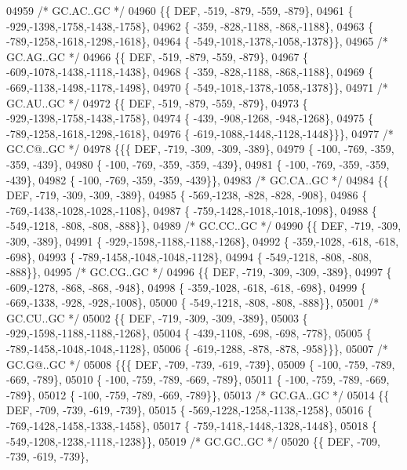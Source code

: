 \begin{DoxyCode}
04959 \textcolor{comment}{/* GC.AC..GC */}
04960 \{\{  DEF, -519, -879, -559, -879\},
04961 \{ -929,-1398,-1758,-1438,-1758\},
04962 \{ -359, -828,-1188, -868,-1188\},
04963 \{ -789,-1258,-1618,-1298,-1618\},
04964 \{ -549,-1018,-1378,-1058,-1378\}\},
04965 \textcolor{comment}{/* GC.AG..GC */}
04966 \{\{  DEF, -519, -879, -559, -879\},
04967 \{ -609,-1078,-1438,-1118,-1438\},
04968 \{ -359, -828,-1188, -868,-1188\},
04969 \{ -669,-1138,-1498,-1178,-1498\},
04970 \{ -549,-1018,-1378,-1058,-1378\}\},
04971 \textcolor{comment}{/* GC.AU..GC */}
04972 \{\{  DEF, -519, -879, -559, -879\},
04973 \{ -929,-1398,-1758,-1438,-1758\},
04974 \{ -439, -908,-1268, -948,-1268\},
04975 \{ -789,-1258,-1618,-1298,-1618\},
04976 \{ -619,-1088,-1448,-1128,-1448\}\}\},
04977 \textcolor{comment}{/* GC.C@..GC */}
04978 \{\{\{  DEF, -719, -309, -309, -389\},
04979 \{ -100, -769, -359, -359, -439\},
04980 \{ -100, -769, -359, -359, -439\},
04981 \{ -100, -769, -359, -359, -439\},
04982 \{ -100, -769, -359, -359, -439\}\},
04983 \textcolor{comment}{/* GC.CA..GC */}
04984 \{\{  DEF, -719, -309, -309, -389\},
04985 \{ -569,-1238, -828, -828, -908\},
04986 \{ -769,-1438,-1028,-1028,-1108\},
04987 \{ -759,-1428,-1018,-1018,-1098\},
04988 \{ -549,-1218, -808, -808, -888\}\},
04989 \textcolor{comment}{/* GC.CC..GC */}
04990 \{\{  DEF, -719, -309, -309, -389\},
04991 \{ -929,-1598,-1188,-1188,-1268\},
04992 \{ -359,-1028, -618, -618, -698\},
04993 \{ -789,-1458,-1048,-1048,-1128\},
04994 \{ -549,-1218, -808, -808, -888\}\},
04995 \textcolor{comment}{/* GC.CG..GC */}
04996 \{\{  DEF, -719, -309, -309, -389\},
04997 \{ -609,-1278, -868, -868, -948\},
04998 \{ -359,-1028, -618, -618, -698\},
04999 \{ -669,-1338, -928, -928,-1008\},
05000 \{ -549,-1218, -808, -808, -888\}\},
05001 \textcolor{comment}{/* GC.CU..GC */}
05002 \{\{  DEF, -719, -309, -309, -389\},
05003 \{ -929,-1598,-1188,-1188,-1268\},
05004 \{ -439,-1108, -698, -698, -778\},
05005 \{ -789,-1458,-1048,-1048,-1128\},
05006 \{ -619,-1288, -878, -878, -958\}\}\},
05007 \textcolor{comment}{/* GC.G@..GC */}
05008 \{\{\{  DEF, -709, -739, -619, -739\},
05009 \{ -100, -759, -789, -669, -789\},
05010 \{ -100, -759, -789, -669, -789\},
05011 \{ -100, -759, -789, -669, -789\},
05012 \{ -100, -759, -789, -669, -789\}\},
05013 \textcolor{comment}{/* GC.GA..GC */}
05014 \{\{  DEF, -709, -739, -619, -739\},
05015 \{ -569,-1228,-1258,-1138,-1258\},
05016 \{ -769,-1428,-1458,-1338,-1458\},
05017 \{ -759,-1418,-1448,-1328,-1448\},
05018 \{ -549,-1208,-1238,-1118,-1238\}\},
05019 \textcolor{comment}{/* GC.GC..GC */}
05020 \{\{  DEF, -709, -739, -619, -739\},

\end{DoxyCode}
